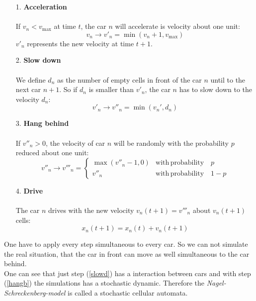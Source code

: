 \documentclass[11pt]{article}
\begin{document}
\begin{itemize}
\item[1.]	\textbf{Acceleration}\\
\\
If $v_n<v_{\mathrm{max}}$ at time $t$, the car $n$ will accelerate is velocity about one unit:
\begin{equation}
v_n \rightarrow v'_n = \min(v_n+1,v_\mathrm{max})
\label{accel}
\end{equation}
$v'_n$ represents the new velocity at time $t+1$.
\item[2.]  \textbf{Slow down}\\
\\
We define $d_n$ as the number of empty cells in front of the car $n$ until to the next car $n+1$. So if $d_n$ is smaller than $v'_n$, the car $n$ has to slow down to the velocity $d_n$:
\begin{equation}
v'_n \rightarrow v''_n = \min(v_n',d_n)
\label{slowd}
\end{equation}
\item[3.]  \textbf{Hang behind}\\
\\
If $v''_n>0$, the velocity of car $n$ will be randomly with the probability $p$ reduced about one unit:
\begin{equation}
v''_n \rightarrow v'''_n=
\begin{cases}
\max(v''_n-1,0) & \mathrm{with\,probability} \quad p\\
v''_n & \mathrm{with\,probability} \quad 1-p
\end{cases}
\label{hangb}
\end{equation}
\item[4.] \textbf{Drive}\\
\\
The car $n$ drives with the new velocity $v_n(t+1)=v'''_n$ about $v_n(t+1)$ cells:
\begin{equation}
x_n(t+1)=x_n(t)+v_n(t+1)
\label{drive}
\end{equation}
\end{itemize}
One have to apply every step simultaneous to every car. So we can not simulate the real situation, that the car in front can move as well simultaneous to the car behind.
\\
One can see that just step (\ref{slowd}) has a interaction between cars and with step (\ref{hangb}) the simulations has a stochastic  dynamic. Therefore the \textit{Nagel-Schreckenberg-model} is called a stochastic cellular automata.
\\
\end{document}
